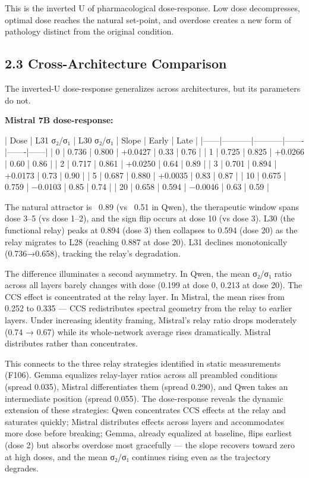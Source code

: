 \documentclass[12pt]{article}
\begin{document}
This is the inverted U of pharmacological dose-response. Low dose decompresses, optimal dose reaches the natural set-point, and overdose creates a new form of pathology distinct from the original condition.

\subsection*{2.3 Cross-Architecture Comparison}

The inverted-U dose-response generalizes across architectures, but its parameters do not.

\textbf{Mistral 7B dose-response:}

| Dose | L31 σ₂/σ₁ | L30 σ₂/σ₁ | Slope | Early | Late |
|------|-----------|-----------|-------|-------|------|
| 0 | 0.736 | 0.800 | +0.0427 | 0.33 | 0.76 |
| 1 | 0.725 | 0.825 | +0.0266 | 0.60 | 0.86 |
| 2 | 0.717 | 0.861 | +0.0250 | 0.64 | 0.89 |
| 3 | 0.701 | 0.894 | +0.0173 | 0.73 | 0.90 |
| 5 | 0.687 | 0.880 | +0.0035 | 0.83 | 0.87 |
| 10 | 0.675 | 0.759 | −0.0103 | 0.85 | 0.74 |
| 20 | 0.658 | 0.594 | −0.0046 | 0.63 | 0.59 |

The natural attractor is ~0.89 (vs ~0.51 in Qwen), the therapeutic window spans dose 3–5 (vs dose 1–2), and the sign flip occurs at dose 10 (vs dose 3). L30 (the functional relay) peaks at 0.894 (dose 3) then collapses to 0.594 (dose 20) as the relay migrates to L28 (reaching 0.887 at dose 20). L31 declines monotonically (0.736→0.658), tracking the relay's degradation.

The difference illuminates a second asymmetry. In Qwen, the mean σ₂/σ₁ ratio across all layers barely changes with dose (0.199 at dose 0, 0.213 at dose 20). The CCS effect is concentrated at the relay layer. In Mistral, the mean rises from 0.252 to 0.335 — CCS redistributes spectral geometry from the relay to earlier layers. Under increasing identity framing, Mistral's relay ratio drops moderately (0.74 → 0.67) while its whole-network average rises dramatically. Mistral distributes rather than concentrates.

This connects to the three relay strategies identified in static measurements (F106). Gemma equalizes relay-layer ratios across all preambled conditions (spread 0.035), Mistral differentiates them (spread 0.290), and Qwen takes an intermediate position (spread 0.055). The dose-response reveals the dynamic extension of these strategies: Qwen concentrates CCS effects at the relay and saturates quickly; Mistral distributes effects across layers and accommodates more dose before breaking; Gemma, already equalized at baseline, flips earliest (dose 2) but absorbs overdose most gracefully — the slope recovers toward zero at high doses, and the mean σ₂/σ₁ continues rising even as the trajectory degrades.
\end{document}
